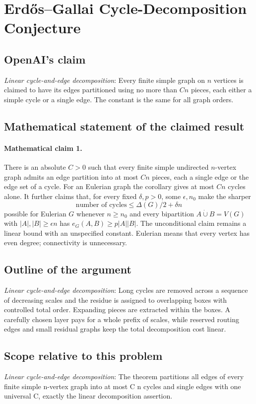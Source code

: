 \documentclass[11pt]{article}
\begin{document}
\section*{Erdős–Gallai Cycle-Decomposition Conjecture}

\subsection{OpenAI's claim}
\textit{Linear cycle-and-edge decomposition}: Every finite simple graph on $n$ vertices is claimed to have its edges partitioned using no more than $Cn$ pieces, each either a simple cycle or a single edge. The constant is the same for all graph orders.

\subsection{Mathematical statement of the claimed result}
\paragraph{Mathematical claim 1.} There is an absolute $C>0$ such that every finite simple undirected $n$-vertex graph admits an edge partition into at most $Cn$ pieces, each a single edge or the edge set of a cycle. For an Eulerian graph the corollary gives at most $Cn$ cycles alone. It further claims that, for every fixed $\delta,p>0$, some $\epsilon,n_0$ make the sharper \[\text{number of cycles}\le\Delta(G)/2+\delta n\] possible for Eulerian $G$ whenever $n\ge n_0$ and every bipartition $A\mathbin{\dot\cup}B=V(G)$ with $|A|,|B|\ge\epsilon n$ has $e_G(A,B)\ge p|A||B|$. The unconditional claim remains a linear bound with an unspecified constant. Eulerian means that every vertex has even degree; connectivity is unnecessary.

\subsection{Outline of the argument}
\textit{Linear cycle-and-edge decomposition}: Long cycles are removed across a sequence of decreasing scales and the residue is assigned to overlapping boxes with controlled total order. Expanding pieces are extracted within the boxes. A carefully chosen layer pays for a whole prefix of scales, while reserved routing edges and small residual graphs keep the total decomposition cost linear.

\subsection{Scope relative to this problem}
\textit{Linear cycle-and-edge decomposition}: The theorem partitions all edges of every finite simple n-vertex graph into at most C n cycles and single edges with one universal C, exactly the linear decomposition assertion.
\end{document}
